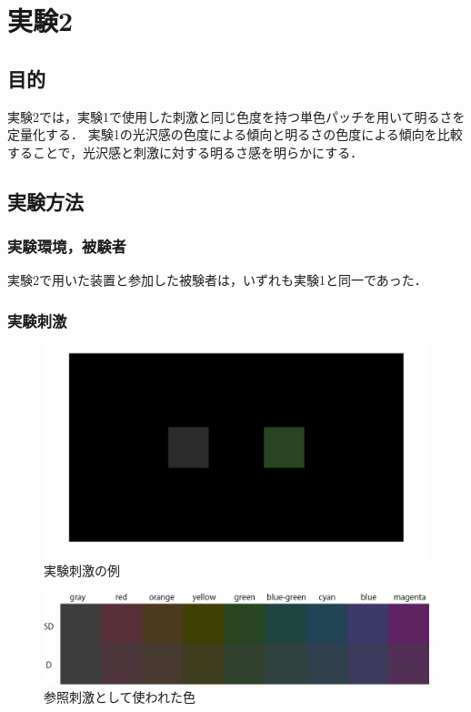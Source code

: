 \chapter{実験2}

    \section{目的}

        実験2では，実験1で使用した刺激と同じ色度を持つ単色パッチを用いて明るさを定量化する．
        実験1の光沢感の色度による傾向と明るさの色度による傾向を比較することで，光沢感と刺激に対する明るさ感を明らかにする．


    \section{実験方法}
        \subsection{実験環境，被験者}

            実験2で用いた装置と参加した被験者は，いずれも実験1と同一であった．

        \subsection{実験刺激}

            \begin{figure}[h]
                \centering
                \includegraphics[width=14.0cm]{./img/ex2_stimuli2.png}
                \caption{実験刺激の例}
                \label{ex2_stimuli}
            \end{figure}

            \begin{figure}[h]
                \centering
                \includegraphics[width=14.0cm]{./img/ex2_stimuli_p.png}
                \caption{参照刺激として使われた色}
                \label{ex2_stimuli_set}
            \end{figure}
            \newpage

